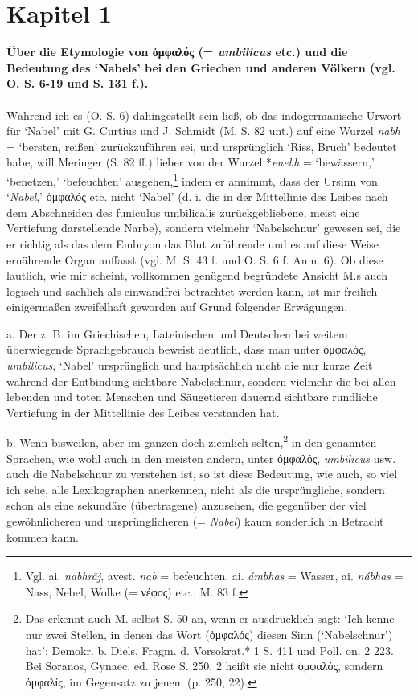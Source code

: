 \documentclass[a4paper, 11pt, oneside]{article}
\begin{document}
\section{Kapitel 1}
\begin{center}
\textbf{Über die Etymologie von ὀμφαλός (= \emph{umbilicus} etc.) und die Bedeutung des `Nabels' bei den Griechen und anderen Völkern (vgl. O. S. 6-19 und S. 131 f.).}
\end{center}
\paragraph{}
Während ich es (O. S. 6) dahingestellt sein ließ, ob das indogermanische Urwort für `Nabel' mit G. Curtius und J. Schmidt (M. S. 82 unt.) auf eine Wurzel \emph{nabh} = `bersten, reißen' zurückzuführen sei, und ursprünglich `Riss, Bruch' bedeutet habe, will Meringer (S. 82 ff.) lieber von der Wurzel *\emph{enebh} = `bewässern,' `benetzen,' `befeuchten' ausgehen,\footnote{Vgl. ai. \emph{nabhrāj}, avest. \emph{nab} = befeuchten, ai. \emph{ámbhas} = Wasser, ai. \emph{nábhas} = Nass, Nebel, Wolke (= νέφος) etc.: M. 83 f.} indem er annimmt, dass der Ursinn von `\emph{Nabel},' ὀμφαλός etc. nicht `Nabel' (d. i. die in der Mittellinie des Leibes nach dem Abschneiden des funiculus umbilicalis zurückgebliebene, meist eine Vertiefung darstellende Narbe), sondern vielmehr `Nabelschnur' gewesen sei, die er richtig als das dem Embryon das Blut zuführende und es auf diese Weise ernährende Organ auffasst (vgl. M. S. 43 f. und O. S. 6 f. Anm. 6). Ob diese lautlich, wie mir scheint, vollkommen genügend begründete Ansicht M.s auch logisch und sachlich als einwandfrei betrachtet werden kann, ist mir freilich einigermaßen zweifelhaft geworden auf Grund folgender Erwägungen.

a. Der z. B. im Griechischen, Lateinischen und Deutschen bei weitem überwiegende Sprachgebrauch beweist deutlich, dass man unter ὀμφαλός, \emph{umbilicus}, `Nabel' ursprünglich und hauptsächlich nicht die nur kurze Zeit während der Entbindung sichtbare Nabelschnur, sondern vielmehr die bei allen lebenden und toten Menschen und Säugetieren dauernd sichtbare rundliche Vertiefung in der Mittellinie des Leibes verstanden hat.

b. Wenn bisweilen, aber im ganzen doch ziemlich selten,\footnote{Das erkennt auch M. selbst S. 50 an, wenn er ausdrücklich sagt: `Ich kenne nur zwei Stellen, in denen das Wort (ὀμφαλός) diesen Sinn (`Nabelschnur') hat': Demokr. b. Diels, Fragm. d. Vorsokrat.* 1 S. 411 und Poll. on. 2 223. Bei Soranos, Gynaec. ed. Rose S. 250, 2 heißt sie nicht ὀμφαλός, sondern ὀμφαλίς, im Gegensatz zu jenem (p. 250, 22).} in den genannten Sprachen, wie wohl auch in den meisten andern, unter ὀμφαλός, \emph{umbilicus} usw. auch die Nabelschnur zu verstehen ist, so ist diese Bedeutung, wie auch, so viel ich sehe, alle Lexikographen anerkennen, nicht als die ursprüngliche, sondern schon als eine sekundäre (übertragene) anzusehen, die gegenüber der viel gewöhnlicheren und ursprünglicheren (= \emph{Nabel}) kaum sonderlich in Betracht kommen kann.
\end{document}
